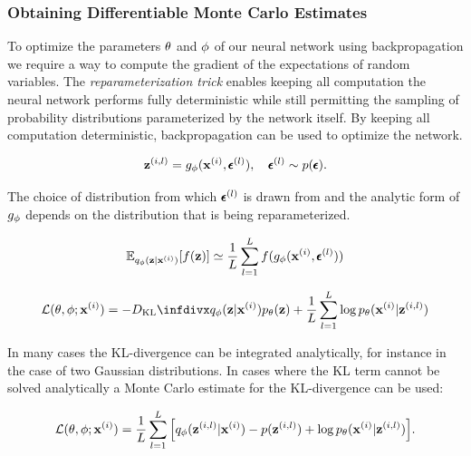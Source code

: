 \subsubsection{Obtaining Differentiable Monte Carlo Estimates}

To optimize the parameters $\theta$ and $\phi$ of our neural network using backpropagation we require a way to compute the gradient of the expectations of random variables. The \textit{reparameterization trick} enables keeping all computation the neural network performs fully deterministic while still permitting the sampling of probability distributions parameterized by the network itself. By keeping all computation deterministic, backpropagation can be used to optimize the network.


$$\mathbf{z}^{(i,l)} = g_{\phi}(\mathbf{x}^{(i)}, \pmb{\epsilon}^{(l)}), \quad \pmb{\epsilon}^{(l)} \sim p(\pmb{\epsilon}).$$

The choice of distribution from which $\pmb{\epsilon}^{(l)}$ is drawn from and the analytic form of $g_{\phi}$ depends on the distribution that is being reparameterized. 

$$\mathbb{E}_{q_{\phi}(\mathbf{z} \vert \mathbf{x}^{(i)})}[f(\mathbf{z})] \simeq \frac{1}{L} \sum_{l=1}^{L} f(g_{\phi}(\mathbf{x}^{(i)}, \pmb{\epsilon}^{(l)}))$$

\begin{equation}
\mathcal{L}(\btheta, \bphi; \bxi) = -\dkl{\qphi(\bz \vert \bxi)}{\ptheta(\bz)} + \frac{1}{L} \sum_{l=1}^{L} \log \ptheta(\bxi \vert \bz^{(i,l)})
\label{eq:vae_loss}
\end{equation}

In many cases the KL-divergence can be integrated analytically, for instance in the case of two Gaussian distributions. In cases where the KL term cannot be solved analytically a Monte Carlo estimate for the KL-divergence can be used:

\begin{equation}
\mathcal{L}(\theta, \phi; \mathbf{x}^{(i)}) = \frac{1}{L} \sum_{l=1}^{L} \Big[q_{\phi}(\mathbf{z}^{(i,l)} \vert \mathbf{x}^{(i)}) - p(\mathbf{z}^{(i,l)}) + \log p_{\theta}(\mathbf{x}^{(i)} \vert \mathbf{z}^{(i,l)})\Big].
\label{eq:vae_loss_2}
\end{equation}

